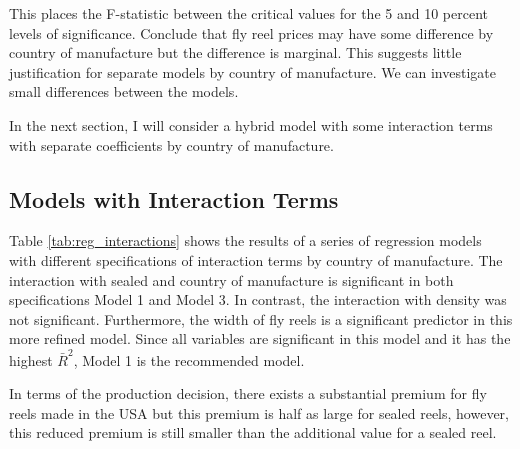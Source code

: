 \documentclass[11pt]{paper}
\begin{document}
This places the F-statistic between the critical values for the
5 and 10 percent levels of significance.
Conclude that fly reel prices may have some difference by
country of manufacture but the difference is marginal.
This suggests little justification for separate models by
country of manufacture.
We can investigate small differences between the models.


In the next section, 
I will consider a hybrid model with some interaction terms
with separate coefficients by country of manufacture. 


\pagebreak
\subsection{Models with Interaction Terms}

Table \ref{tab:reg_interactions} shows the results of 
a series of regression models with different 
specifications of interaction terms by country of manufacture. 
% 
The interaction with sealed and country of manufacture is significant in both specifications Model 1 and Model 3.
In contrast, the interaction with density was not significant. 
Furthermore, the width of fly reels is a significant predictor
in this more refined model. 
Since all variables are significant in this model and it
has the highest $\bar{R}^2$, Model 1 is the recommended model.





In terms of the production decision, 
there exists a substantial premium for fly reels made in the USA
but this premium is half as large for sealed reels, 
however, this reduced premium is still smaller than the 
additional value for a sealed reel.  


\end{document}
